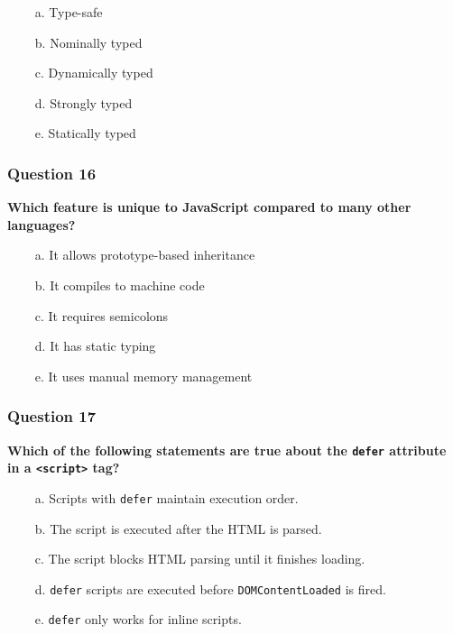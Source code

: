 \documentclass{article}
\newcommand{\cmark}{\textcolor{green}{\ding{51}}} %
\newcommand{\xmark}{\textcolor{red}{\ding{55}}}   %
\begin{document}
\begin{itemize}
  \item[\xmark\ a.] Type-safe
  \item[\xmark\ b.] Nominally typed
  \item[\cmark\ c.] Dynamically typed
  \item[\xmark\ d.] Strongly typed
  \item[\xmark\ e.] Statically typed
\end{itemize}

\subsubsection*{Question 16}
\textbf{Which feature is unique to JavaScript compared to many other languages?}

\begin{itemize}
  \item[\cmark\ a.] It allows prototype-based inheritance
  \item[\xmark\ b.] It compiles to machine code
  \item[\xmark\ c.] It requires semicolons
  \item[\xmark\ d.] It has static typing
  \item[\xmark\ e.] It uses manual memory management
\end{itemize}

\subsubsection*{Question 17}
\textbf{Which of the following statements are true about the \texttt{defer} attribute in a \texttt{<script>} tag?}

\begin{itemize}
  \item[\cmark\ a.] Scripts with \texttt{defer} maintain execution order.
  \item[\cmark\ b.] The script is executed after the HTML is parsed.
  \item[\xmark\ c.] The script blocks HTML parsing until it finishes loading.
  \item[\cmark\ d.] \texttt{defer} scripts are executed before \texttt{DOMContentLoaded} is fired.
  \item[\xmark\ e.] \texttt{defer} only works for inline scripts.
\end{itemize}
\end{document}
